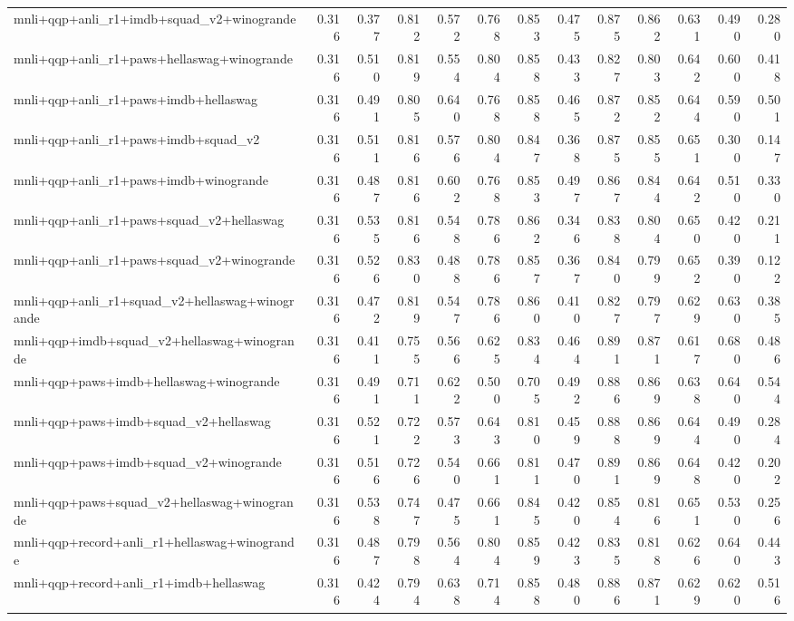 \begin{table}[t]
\begin{tabular}{lrrrrrrrrrrrr}
    mnli+qqp+anli\_r1+imdb+squad\_v2+winogrande & 0.316 & 0.377 & 0.812 & 0.572 & 0.768 & 0.853 & 0.475 & 0.875 & 0.862 & 0.631 & 0.490 & 0.280 \\
    mnli+qqp+anli\_r1+paws+hellaswag+winogrande & 0.316 & 0.510 & 0.819 & 0.554 & 0.804 & 0.858 & 0.433 & 0.827 & 0.803 & 0.642 & 0.600 & 0.418 \\
    mnli+qqp+anli\_r1+paws+imdb+hellaswag & 0.316 & 0.491 & 0.805 & 0.640 & 0.768 & 0.858 & 0.465 & 0.872 & 0.852 & 0.644 & 0.590 & 0.501 \\
    mnli+qqp+anli\_r1+paws+imdb+squad\_v2 & 0.316 & 0.511 & 0.816 & 0.576 & 0.804 & 0.847 & 0.368 & 0.875 & 0.855 & 0.651 & 0.300 & 0.147 \\
    mnli+qqp+anli\_r1+paws+imdb+winogrande & 0.316 & 0.487 & 0.816 & 0.602 & 0.768 & 0.853 & 0.497 & 0.867 & 0.844 & 0.642 & 0.510 & 0.330 \\
    mnli+qqp+anli\_r1+paws+squad\_v2+hellaswag & 0.316 & 0.535 & 0.816 & 0.548 & 0.786 & 0.862 & 0.346 & 0.838 & 0.804 & 0.650 & 0.420 & 0.211 \\
    mnli+qqp+anli\_r1+paws+squad\_v2+winogrande & 0.316 & 0.526 & 0.830 & 0.488 & 0.786 & 0.857 & 0.367 & 0.840 & 0.799 & 0.652 & 0.390 & 0.122 \\
    mnli+qqp+anli\_r1+squad\_v2+hellaswag+winogrande & 0.316 & 0.472 & 0.819 & 0.547 & 0.786 & 0.860 & 0.410 & 0.827 & 0.797 & 0.629 & 0.630 & 0.385 \\
    mnli+qqp+imdb+squad\_v2+hellaswag+winogrande & 0.316 & 0.411 & 0.755 & 0.566 & 0.625 & 0.834 & 0.464 & 0.891 & 0.871 & 0.617 & 0.680 & 0.486 \\
    mnli+qqp+paws+imdb+hellaswag+winogrande & 0.316 & 0.491 & 0.711 & 0.622 & 0.500 & 0.705 & 0.492 & 0.886 & 0.869 & 0.638 & 0.640 & 0.544 \\
    mnli+qqp+paws+imdb+squad\_v2+hellaswag & 0.316 & 0.521 & 0.722 & 0.573 & 0.643 & 0.810 & 0.459 & 0.888 & 0.869 & 0.644 & 0.490 & 0.284 \\
    mnli+qqp+paws+imdb+squad\_v2+winogrande & 0.316 & 0.516 & 0.726 & 0.540 & 0.661 & 0.811 & 0.470 & 0.891 & 0.869 & 0.648 & 0.420 & 0.202 \\
    mnli+qqp+paws+squad\_v2+hellaswag+winogrande & 0.316 & 0.538 & 0.747 & 0.475 & 0.661 & 0.845 & 0.420 & 0.854 & 0.816 & 0.651 & 0.530 & 0.256 \\
    mnli+qqp+record+anli\_r1+hellaswag+winogrande & 0.316 & 0.487 & 0.798 & 0.564 & 0.804 & 0.859 & 0.423 & 0.835 & 0.818 & 0.626 & 0.640 & 0.443 \\
    mnli+qqp+record+anli\_r1+imdb+hellaswag & 0.316 & 0.424 & 0.794 & 0.638 & 0.714 & 0.858 & 0.480 & 0.886 & 0.871 & 0.629 & 0.620 & 0.516 \\

\end{tabular}
\end{table}
